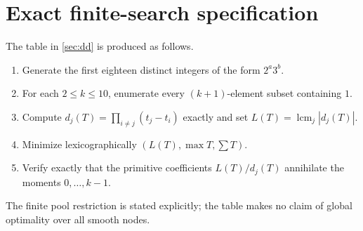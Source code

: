 \documentclass[11pt]{article}
\theoremstyle{definition}
\theoremstyle{remark}
\newcommand{\lcmop}{\operatorname{lcm}}
\begin{document}
\section{Exact finite-search specification}

The table in \cref{sec:dd} is produced as follows.
\begin{enumerate}
\item Generate the first eighteen distinct integers of the form $2^a3^b$.
\item For each $2\le k\le10$, enumerate every $(k+1)$-element subset containing $1$.
\item Compute $d_j(T)=\prod_{i\ne j}(t_j-t_i)$ exactly and set $L(T)=\lcmop_j|d_j(T)|$.
\item Minimize lexicographically $(L(T),\max T,\sum T)$.
\item Verify exactly that the primitive coefficients $L(T)/d_j(T)$ annihilate the moments $0,\ldots,k-1$.
\end{enumerate}
The finite pool restriction is stated explicitly; the table makes no claim of global optimality over all smooth nodes.
\end{document}
